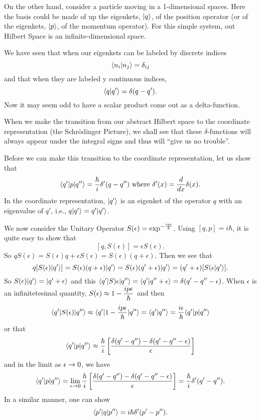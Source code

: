 On the other hand, consider a particle moving in a 1-dimensional spaces. Here the basis could be made of up the eigenkets, $|q\rangle$, of the position operator (or of the eigenkets, $|p\rangle$, of the momentum operator). For this 
simple system, out Hilbert Space is an infinite-dimensional space. 

We have seen that when our eigenkets can be labeled by discrete indices 
$$\langle n_i|n_j\rangle = \delta_{ij}$$ and that when they are labeled y continuous indices, 
$$\langle q|q'\rangle = \delta(q-q').$$
Now it may seem odd to have a scalar product come out as a delta-function.

When we make the transition from our abstract Hilbert space to the coordinate representation (the Schr\"odinger Picture), we shall see that these $\delta$-functions will always appear under the integral signs and thus
will ``give us no trouble''.

Before we can make this transition to the coordinate representation, let us show that 
$$\langle q'| p| q'' \rangle = {\hbar\over i} \delta'(q-q'') \mbox{ where } \delta'(x) = {d\over dx}\delta(x).$$
In the coordinate representation, $|q'\rangle$ is an eigenket of the operator $q$ with an eigenvalue of $q'$, i.e., $q|q'\rangle = q'|q'\rangle$. 

We now consider the Unitary Operator $\displaystyle S(\epsilon) = \exp^{-{iq\epsilon\over\hbar}}$. Using $[q,p] = i\hbar$, it is quite easy to show that 
$$[q,S(\epsilon)] = \epsilon S(\epsilon).$$ 
So $qS(\epsilon) = S(\epsilon) q + \epsilon S(\epsilon) = S(\epsilon)(q + \epsilon)$. Then we see that 
$$q[S(\epsilon)|q'\rangle] = S(\epsilon)(q+\epsilon)|q'\rangle = S(\epsilon)(q' + \epsilon)|q'\rangle = (q' + \epsilon)[S(\epsilon|q'\rangle].$$
So $S(\epsilon)|q'\rangle = |q'+ \epsilon\rangle$ and this $\displaystyle \langle q'| S)\epsilon| q'' \rangle = \langle q'|q''+\epsilon\rangle = \delta(q'-q''-\epsilon)$. 
When $\epsilon$ is an infinitetesimal quantity, $\displaystyle S(\epsilon) \approx 1 - {i p\epsilon\over \hbar}$ and then 
$$ \langle q'| S(\epsilon)| q'' \rangle \approx \langle q'| 1 - {i p\epsilon\over \hbar}| q'' \rangle = \langle q'|q''\rangle =  {i \epsilon\over \hbar}\langle q'| p| q'' \rangle$$ 
or that 
$$\langle q'| p| q'' \rangle \approx {\hbar\over i} \left[ {\delta(q'-q'') - \delta(q'-q''-\epsilon)\over \epsilon}\right]$$ and in the limit as $\epsilon\rightarrow 0$, we have 
$$\langle q'| p| q'' \rangle = \lim_{\epsilon\rightarrow 0} {\hbar\over i} \left[ {\delta(q'-q'') - \delta(q'-q''-\epsilon)\over \epsilon}\right] = {\hbar\over i} \delta'(q'-q'').$$ \label{10-VI}
In a similar manner, one can show
$$\langle p'| q| p'' \rangle = i\hbar \delta'(p'-p'').$$
 
